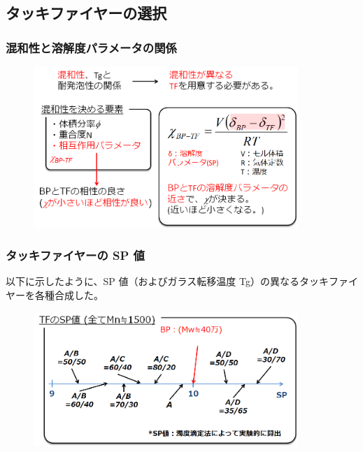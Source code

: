 \documentclass[12pt, dvipdfmx]{beamer}
\begin{document}
\subsection{タッキファイヤーの選択}
%
\begin{frame}\frametitle{混和性と溶解度パラメータの関係}
	\begin{figure}
		\begin{center}
			\includegraphics[width=100mm]{konwa.png}
		\end{center}
	\end{figure}
\end{frame}

\begin{frame}\frametitle{タッキファイヤーの SP 値}
	以下に示したように、SP 値（およびガラス転移温度	 Tg）の異なるタッキファイヤーを各種合成した。
		\begin{figure}
			\begin{center}
				\includegraphics[width=100mm]{Tackifier_list.png}
			\end{center}
		\end{figure}
	\end{frame}
	
\end{document}
